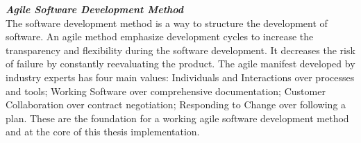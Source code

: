 \textbf{\textit{Agile Software Development Method}}\\
The software development method is a way to structure the development of software. An agile method emphasize development cycles to increase the transparency and flexibility during the software development. It decreases the risk of failure by constantly reevaluating the product. The agile manifest developed by industry experts\cite{beck2001manifestoAgile} has four main values: Individuals and Interactions over processes and tools; Working Software over comprehensive documentation; Customer Collaboration over contract negotiation; Responding to Change over following a plan. These are the foundation for a working agile software development method and at the core of this thesis implementation.
